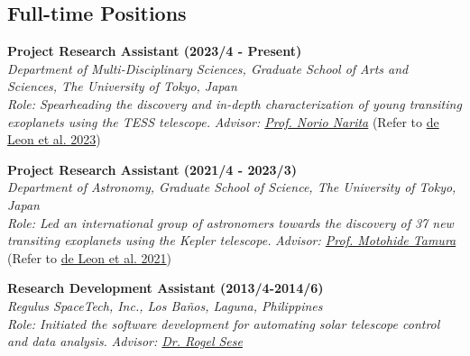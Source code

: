 \documentclass[11pt,letterpaper]{article}
\begin{document}
\subsection{Full-time Positions}
\begin{list}{}{\cvlist}
    \item
        \textbf{Project Research Assistant (2023/4 - Present)} \\
        \textit{Department of Multi-Disciplinary Sciences, Graduate School of Arts and Sciences, The University of Tokyo, Japan} \\
        \textit{Role: Spearheading the discovery and in-depth characterization of young transiting exoplanets using the TESS telescope.}
        \textit{Advisor: \href{\naritaurl}{Prof. Norio Narita}} (Refer to \href{\paperthree}{de Leon et al. 2023})\\

    \item
        \textbf{Project Research Assistant (2021/4 - 2023/3)} \\
        \textit{Department of Astronomy, Graduate School of Science, The University of Tokyo, Japan} \\
        \textit{Role: Led an international group of astronomers towards the discovery of 37 new transiting exoplanets using the Kepler telescope.}
        \textit{Advisor: \href{tamuraurl}{Prof. Motohide Tamura}} (Refer to \href{\papertwo}{de Leon et al. 2021})\\
        
    \item
        \textbf{Research Development Assistant (2013/4-2014/6)}\\
        \textit{Regulus SpaceTech, Inc., Los Ba\~nos, Laguna, Philippines}\\
        \textit{Role: Initiated the software development for automating solar telescope control and data analysis.}
        \textit{Advisor: \href{\seseurl}{Dr. Rogel Sese}} \\
\end{list}
\end{document}
